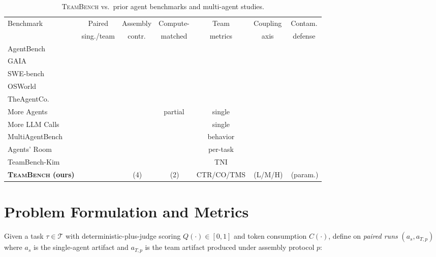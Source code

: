\documentclass[sigconf,anonymous]{aamas}
\newcommand{\teambench}{\textsc{TeamBench}}
\newcommand{\cmark}{\ding{51}}
\newcommand{\xmark}{\ding{55}}
\begin{document}
\begin{table}[t]
\centering
\caption{\teambench{} vs.\ prior agent benchmarks and multi-agent studies.}
\label{tab:comparison}
\small
\setlength{\tabcolsep}{2.5pt}
\begin{tabular}{lcccccc}
\toprule
Benchmark & Paired & Assembly & Compute- & Team & Coupling & Contam.\\
 & sing./team & contr. & matched & metrics & axis & defense \\
\midrule
AgentBench~\citep{liu2023agentbench} & \xmark & \xmark & \xmark & \xmark & \xmark & \xmark \\
GAIA~\citep{mialon2023gaia} & \xmark & \xmark & \xmark & \xmark & \xmark & \xmark \\
SWE-bench~\citep{jimenez2024swebench} & \xmark & \xmark & \xmark & \xmark & \xmark & \xmark \\
OSWorld~\citep{xie2024osworld} & \xmark & \xmark & \xmark & \xmark & \xmark & \xmark \\
TheAgentCo.~\citep{xu2024theagentcompany} & \xmark & \xmark & \xmark & \xmark & \xmark & \xmark \\
More Agents~\citep{li2024moreagents} & \xmark & \xmark & partial & single & \xmark & \xmark \\
More LLM Calls~\citep{chen2024morellmcalls} & \xmark & \xmark & \cmark & single & \xmark & \xmark \\
MultiAgentBench~\citep{zhu2025multiagentbench} & \xmark & \xmark & \xmark & behavior & \xmark & \xmark \\
Agents' Room~\citep{huot2025agentsroom} & \xmark & \xmark & \xmark & per-task & \xmark & \xmark \\
TeamBench-Kim~\citep{kim2026teambench} & \cmark & \xmark & \xmark & TNI & \xmark & \cmark \\
\textbf{\teambench{} (ours)} & \cmark & \cmark\,(4) & \cmark\,(2) & CTR/CO/TMS & \cmark\,(L/M/H) & \cmark\,(param.) \\
\bottomrule
\end{tabular}
\end{table}

\section{Problem Formulation and Metrics}
\label{sec:formulation}

Given a task $\tau \in \mathcal{T}$ with deterministic-plus-judge scoring $Q(\cdot) \in [0,1]$ and token consumption $C(\cdot)$, define on \emph{paired runs} $(a_s, a_{T,p})$ where $a_s$ is the single-agent artifact and $a_{T,p}$ is the team artifact produced under assembly protocol $p$:
\end{document}
